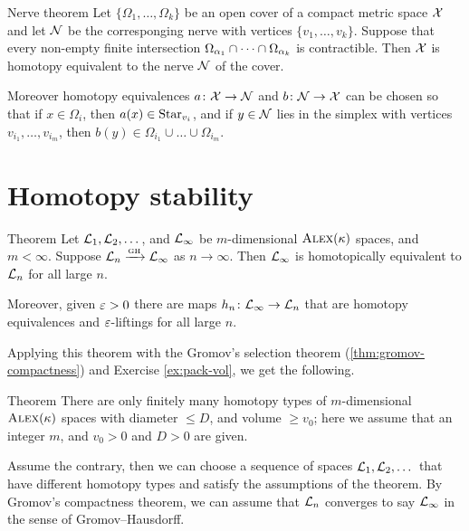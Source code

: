 \begin{thm}{Nerve theorem}\label{thm:nerve}
Let $\{\Omega_1,\dots,\Omega_k\}$ be an open cover of a compact metric space $\mathcal{X}$
and let $\mathcal{N}$ be the corresponging nerve with vertices $\{v_1,\dots,v_k\}$.
Suppose that every non-empty finite intersection $\Omega_{\alpha_1}\cap\dots\cap\Omega_{\alpha_k}$ is contractible.
Then $\mathcal{X}$ is homotopy equivalent to the nerve $\mathcal{N}$ of the cover.

Moreover homotopy equivalences  $a\colon\mathcal{X}\to \mathcal{N}$ and $b\colon\mathcal{N}\to\mathcal{X}$ can be chosen so that 
if $x\in \Omega_i$, then $a(x)\in \mathop{\rm Star}\nolimits_{v_i}$,
and if $y\in\mathcal{N}$ lies in the simplex with vertices $v_{i_1},\dots, v_{i_m}$, then $b(y)\in \Omega_{i_1}\cup\dots\cup \Omega_{i_m}$.
\end{thm}



\section{Homotopy stability}

\begin{thm}{Theorem}\label{thm:h-stability}
Let $\mathcal{L}_1,\mathcal{L}_2,\dots$, and $\mathcal{L}_\infty$ be $m$-dimensional $\textsc{Alex}(\kappa)$ spaces, and $m<\infty$.
Suppose $\mathcal{L}_n\xrightarrow{\mbox{\tiny\rm GH}} \mathcal{L}_\infty$ as $n\to \infty$.
Then $\mathcal{L}_\infty$ is homotopically equivalent to $\mathcal{L}_n$ for all large $n$.

Moreover, given $\varepsilon>0$ there are maps $h_n\colon\mathcal{L}_\infty\to \mathcal{L}_n$ that are homotopy equivalences and $\varepsilon$-liftings for all large $n$.
\end{thm}

Applying this theorem with the Gromov's selection theorem (\ref{thm:gromov-compactness}) and Exercise \ref{ex:pack-vol}, we get the following.


\begin{thm}{Theorem}\label{thm:h-finiteness}
There are only finitely many homotopy types of $m$-dimensional $\textsc{Alex}(\kappa)$ spaces with diameter $\le D$, and volume $\ge v_0$;
here we assume that an integer $m$, and $v_0>0$ and $D>0$ are given.
\end{thm}

Assume the contrary, then we can choose a sequence of spaces $\mathcal{L}_1,\mathcal{L}_2,\dots$ that have different homotopy types and satisfy the assumptions of the theorem.
By Gromov's compactness theorem, we can assume that $\mathcal{L}_n$ converges to say $\mathcal{L}_\infty$ in the sense of Gromov--Hausdorff.

